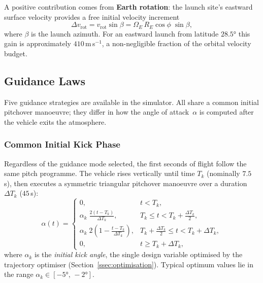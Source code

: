 A positive contribution comes from \textbf{Earth rotation}: the launch site's
eastward surface velocity provides a free initial velocity increment
\begin{equation}
  \Delta v_{\text{rot}} = v_{\text{rot}}\sin\beta
  = \Omega_E\,R_E\cos\phi\;\sin\beta,
  \label{eq:dv_rot}
\end{equation}
where $\beta$ is the launch azimuth.  For an eastward launch from latitude
$28.5°$ this gain is approximately $410$\,m\,s$^{-1}$, a non-negligible
fraction of the orbital velocity budget.

\subsection{Guidance Laws}
\label{ssec:guidance}

Five guidance strategies are available in the simulator.  All share a common
initial pitchover manoeuvre; they differ in how the angle of attack~$\alpha$ is
computed after the vehicle exits the atmosphere.

\subsubsection{Common Initial Kick Phase}
\label{sssec:kick_phase}

Regardless of the guidance mode selected, the first seconds of flight follow
the same pitch programme.  The vehicle rises vertically until time $T_k$
(nominally $7.5$\,s), then executes a symmetric triangular pitchover manoeuvre
over a duration $\Delta T_k$ ($45$\,s):
\begin{equation}
  \alpha(t) =
  \begin{cases}
    0, & t < T_k, \\[2pt]
    \displaystyle\alpha_k\;\frac{2(t - T_k)}{\Delta T_k},
      & T_k \le t < T_k + \tfrac{\Delta T_k}{2}, \\[6pt]
    \displaystyle\alpha_k\;2\!\left(1 - \frac{t - T_k}{\Delta T_k}\right),
      & T_k + \tfrac{\Delta T_k}{2} \le t < T_k + \Delta T_k, \\[6pt]
    0, & t \ge T_k + \Delta T_k,
  \end{cases}
  \label{eq:kick_profile}
\end{equation}
where $\alpha_k$ is the \emph{initial kick angle}, the single design variable
optimised by the trajectory optimiser (Section~\ref{ssec:optimisation}).
Typical optimum values lie in the range $\alpha_k \in [-5°,\,-2°]$.


